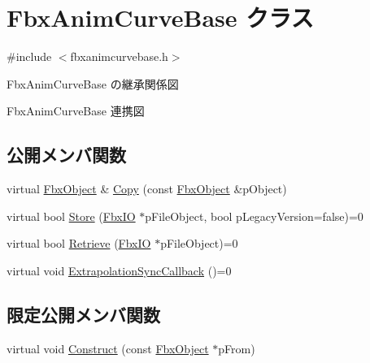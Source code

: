\hypertarget{class_fbx_anim_curve_base}{}\section{Fbx\+Anim\+Curve\+Base クラス}
\label{class_fbx_anim_curve_base}


{\ttfamily \#include $<$fbxanimcurvebase.\+h$>$}



Fbx\+Anim\+Curve\+Base の継承関係図


Fbx\+Anim\+Curve\+Base 連携図
\subsection*{公開メンバ関数}
\begin{DoxyCompactItemize}
\item 
virtual \hyperlink{class_fbx_object}{Fbx\+Object} \& \hyperlink{class_fbx_anim_curve_base_abdd0a239c39552fe978b1b571a4d5465}{Copy} (const \hyperlink{class_fbx_object}{Fbx\+Object} \&p\+Object)
\item 
virtual bool \hyperlink{class_fbx_anim_curve_base_a82eba55521f1c0e792b71cb432dac170}{Store} (\hyperlink{class_fbx_i_o}{Fbx\+IO} $\ast$p\+File\+Object, bool p\+Legacy\+Version=false)=0
\item 
virtual bool \hyperlink{class_fbx_anim_curve_base_a58ba1ce28a08145795d95bb27e2db02f}{Retrieve} (\hyperlink{class_fbx_i_o}{Fbx\+IO} $\ast$p\+File\+Object)=0
\item 
virtual void \hyperlink{class_fbx_anim_curve_base_aab573e42ece898c2c1e61a295adbb610}{Extrapolation\+Sync\+Callback} ()=0
\end{DoxyCompactItemize}
\subsection*{限定公開メンバ関数}
\begin{DoxyCompactItemize}
\item 
virtual void \hyperlink{class_fbx_anim_curve_base_af8e0d506c1a09c9fbd7432d4eb5caa02}{Construct} (const \hyperlink{class_fbx_object}{Fbx\+Object} $\ast$p\+From)
\end{DoxyCompactItemize}
